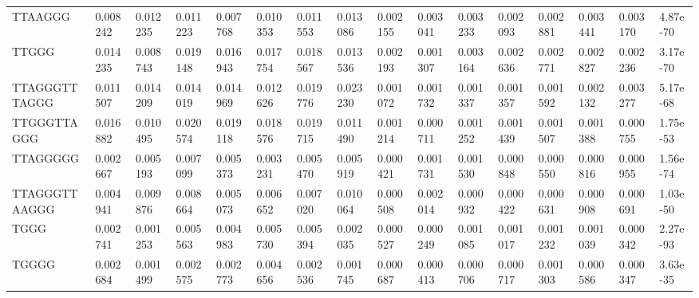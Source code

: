 \begin{samepage}
\begin{table}[h!]
\begin{tabular}{llllllllllllllll}
TTAAGGG         & 0.008242       & 0.012235       & 0.011223       & 0.007768       & 0.010353       & 0.011553       & 0.013086       & 0.002155       & 0.003041       & 0.003233       & 0.002093       & 0.002881       & 0.003441       & 0.003170       & 4.87e-70                           \\
TTGGG           & 0.014235       & 0.008743       & 0.019148       & 0.016943       & 0.017754       & 0.018567       & 0.013536       & 0.002193       & 0.001307       & 0.003164       & 0.002636       & 0.002771       & 0.002827       & 0.002236       & 3.17e-70                           \\
TTAGGGTTTAGGG   & 0.011507       & 0.014209       & 0.014019       & 0.014969       & 0.012626       & 0.019776       & 0.023230       & 0.001072       & 0.001732       & 0.001337       & 0.001357       & 0.001592       & 0.002132       & 0.003277       & 5.17e-68                           \\
TTGGGTTAGGG     & 0.016882       & 0.010495       & 0.020574       & 0.019118       & 0.018576       & 0.019715       & 0.011490       & 0.001214       & 0.000711       & 0.001252       & 0.001439       & 0.001507       & 0.001388       & 0.000755       & 1.75e-53                           \\
TTAGGGGG        & 0.002667       & 0.005193       & 0.007099       & 0.005373       & 0.003231       & 0.005470       & 0.005919       & 0.000421       & 0.001731       & 0.001530       & 0.000848       & 0.000550       & 0.000816       & 0.000955       & 1.56e-74                           \\
TTAGGGTTAAGGG   & 0.004941       & 0.009876       & 0.008664       & 0.005073       & 0.006652       & 0.007020       & 0.010064       & 0.000508       & 0.002014       & 0.000932       & 0.000422       & 0.000631       & 0.000908       & 0.000691       & 1.03e-50                           \\
TGGG            & 0.002741       & 0.001253       & 0.005563       & 0.004983       & 0.005730       & 0.005394       & 0.002035       & 0.000527       & 0.000249       & 0.001085       & 0.001017       & 0.001232       & 0.001039       & 0.000342       & 2.27e-93                           \\
TGGGG           & 0.002684       & 0.001499       & 0.002575       & 0.002773       & 0.004656       & 0.002536       & 0.001745       & 0.000687       & 0.000413       & 0.000706       & 0.000717       & 0.001303       & 0.000586       & 0.000347       & 3.63e-35                           \\

\end{tabular}
\end{table}
\end{samepage}
